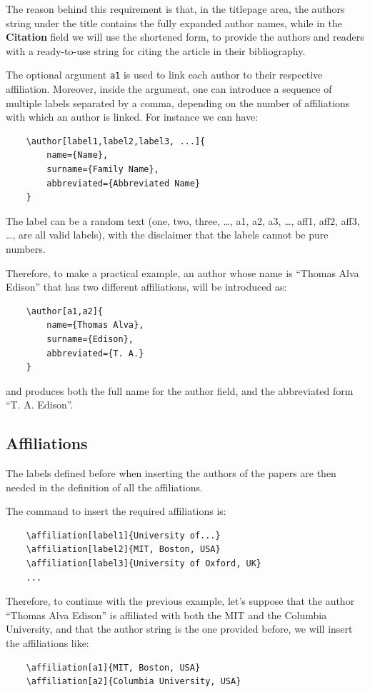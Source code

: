 \documentclass[11pt,onecolumn,notitlepage]{article}
\begin{document}
The reason behind this requirement is that, in the titlepage area, the authors string under the title contains the fully expanded author names, while in the \textbf{Citation} field we will use the shortened form, to provide the authors and readers with a ready-to-use string for citing the article in their bibliography.

The optional argument \verb|a1| is used to link each author to their respective affiliation. 
Moreover, inside the argument, one can introduce a sequence of multiple labels separated by a comma, depending on the number of affiliations with which an author is linked. For instance we can have:
\begin{verbatim}
	\author[label1,label2,label3, ...]{
		name={Name},
		surname={Family Name},
		abbreviated={Abbreviated Name}
	}
\end{verbatim}

The label can be a random text (one, two, three, \dots, a1, a2, a3, \dots, aff1, aff2, aff3, \dots, are all valid labels), with the disclaimer that the labels cannot be pure numbers.
\medskip

Therefore, to make a practical example, an author whose name is ``Thomas Alva Edison'' that has two different affiliations, will be introduced as:
\begin{verbatim}
	\author[a1,a2]{
		name={Thomas Alva},
		surname={Edison},
		abbreviated={T. A.}
	}
\end{verbatim}
and produces both the full name for the author field, and the abbreviated form ``T. A. Edison''.


\subsection{Affiliations}

The labels defined before when inserting the authors of the papers are then needed in the definition of all the affiliations.

The command to insert the required affiliations is:
\begin{verbatim}
	\affiliation[label1]{University of...}
	\affiliation[label2]{MIT, Boston, USA}
	\affiliation[label3]{University of Oxford, UK}
	...
\end{verbatim}

Therefore, to continue with the previous example, let's suppose that the author ``Thomas Alva Edison'' is affiliated with both the MIT and the Columbia University, and that the author string is the one provided before, we will insert the affiliations like:
\begin{verbatim}
	\affiliation[a1]{MIT, Boston, USA}
	\affiliation[a2]{Columbia University, USA}
\end{verbatim}
\end{document}
